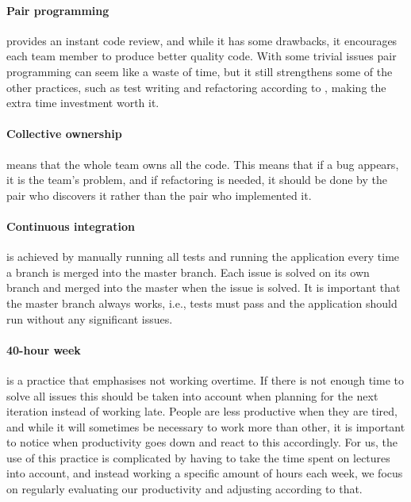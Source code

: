 \paragraph{Pair programming} provides an instant code review, and while it has some drawbacks, it encourages each team member to produce better quality code. With some trivial issues pair programming can seem like a waste of time, but it still strengthens some of the other practices, such as test writing and refactoring according to \citet[p. 102]{xp:explained}, making the extra time investment worth it. 

\paragraph{Collective ownership} means that the whole team owns all the code. This means that if a bug appears, it is the team's problem, and if refactoring is needed, it should be done by the pair who discovers it rather than the pair who implemented it.

\paragraph{Continuous integration} is achieved by manually running all tests and running the application every time a branch is merged into the master branch. Each issue is solved on its own branch and merged into the master when the issue is solved. It is important that the master branch always works, i.e., tests must pass and the application should run without any significant issues.

\paragraph{40-hour week} is a practice that emphasises not working overtime. If there is not enough time to solve all issues this should be taken into account when planning for the next iteration instead of working late. People are less productive when they are tired, and while it will sometimes be necessary to work more than other, it is important to notice when productivity goes down and react to this accordingly. For us, the use of this practice is complicated by having to take the time spent on lectures into account, and instead working a specific amount of hours each week, we focus on regularly evaluating our productivity and adjusting according to that.
 
